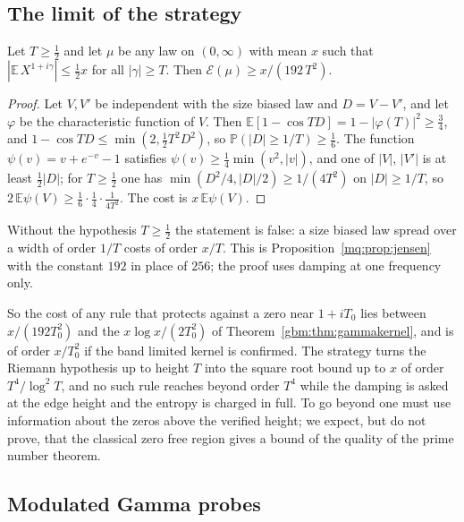 \subsection{The limit of the strategy}

\begin{theorem}\label{gbm:thm:lower}
Let $T\ge\frac12$ and let $\mu$ be any law on $(0,\infty)$ with mean $x$ such that $|\mathbb E\,X^{1+i\gamma}|\le\frac12x$ for all $|\gamma|\ge T$. Then $\mathcal E(\mu)\ge x/(192\,T^2)$.
\end{theorem}

\begin{proof}
Let $V,V'$ be independent with the size biased law and $D=V-V'$, and let $\varphi$ be the characteristic function of $V$. Then $\mathbb E[1-\cos TD]=1-|\varphi(T)|^2\ge\frac34$, and $1-\cos TD\le\min(2,\frac12T^2D^2)$, so $\mathbb P(|D|\ge1/T)\ge\frac16$. The function $\psi(v)=v+e^{-v}-1$ satisfies $\psi(v)\ge\frac14\min(v^2,|v|)$, and one of $|V|$, $|V'|$ is at least $\frac12|D|$; for $T\ge\frac12$ one has $\min(D^2/4,|D|/2)\ge1/(4T^2)$ on $|D|\ge1/T$, so $2\,\mathbb E\psi(V)\ge\frac16\cdot\frac14\cdot\frac1{4T^2}$. The cost is $x\,\mathbb E\psi(V)$.
\end{proof}

Without the hypothesis $T\ge\frac12$ the statement is false: a size biased law spread over a width of order $1/T$ costs of order $x/T$. This is Proposition~\ref{mq:prop:jensen} with the constant $192$ in place of $256$; the proof uses damping at one frequency only.

So the cost of any rule that protects against a zero near $1+iT_0$ lies between $x/(192T_0^2)$ and the $x\log x/(2T_0^2)$ of Theorem~\ref{gbm:thm:gammakernel}, and is of order $x/T_0^2$ if the band limited kernel is confirmed. The strategy turns the Riemann hypothesis up to height $T$ into the square root bound up to $x$ of order $T^4/\log^2T$, and no such rule reaches beyond order $T^4$ while the damping is asked at the edge height and the entropy is charged in full. To go beyond one must use information about the zeros above the verified height; we expect, but do not prove, that the classical zero free region gives a bound of the quality of the prime number theorem.

\subsection{Modulated Gamma probes}

